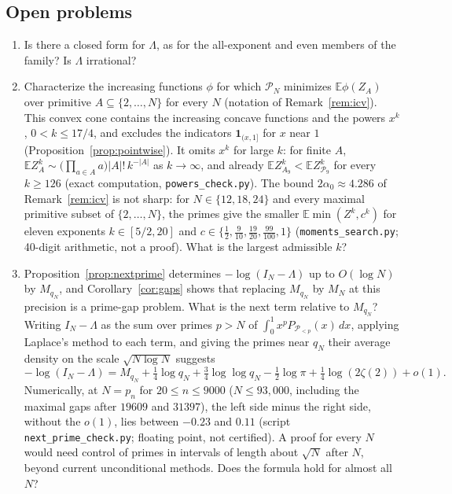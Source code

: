 \documentclass[11pt]{article}
\theoremstyle{remark}
\newcommand{\Prm}{\mathcal{P}}
\newcommand{\E}{\mathbb{E}}
\begin{document}
\subsection{Open problems}
\begin{enumerate}
\item Is there a closed form for $\Lambda$, as for the all-exponent and
even members of the family? Is $\Lambda$ irrational?
\item Characterize the increasing functions $\phi$ for which $\Prm_N$
minimizes $\E\phi(Z_A)$ over primitive $A\subseteq\{2,\dots,N\}$ for
every $N$ (notation of Remark~\ref{rem:icv}). This convex cone contains
the increasing concave functions and the powers $x^k$, $0<k\le17/4$,
and excludes the indicators $\mathbf 1_{(x,1]}$ for $x$ near $1$
(Proposition~\ref{prop:pointwise}). It omits $x^k$ for large $k$: for
finite $A$,
$\E Z_A^k\sim\bigl(\prod_{a\in A}a\bigr)|A|!\,k^{-|A|}$ as
$k\to\infty$, and already $\E Z_{A_9}^k<\E Z_{\Prm_9}^k$ for every
$k\ge126$ (exact computation, \texttt{powers\_check.py}). The bound
$2\alpha_0\approx4.286$ of Remark~\ref{rem:icv} is not sharp: for
$N\in\{12,18,24\}$ and every maximal primitive subset of
$\{2,\dots,N\}$, the primes give the smaller $\E\min(Z^k,c^k)$ for
eleven exponents $k\in[5/2,20]$ and
$c\in\{\tfrac12,\tfrac9{10},\tfrac{19}{20},\tfrac{99}{100},1\}$
(\texttt{moments\_search.py}; 40-digit arithmetic, not a proof). What
is the largest admissible $k$?
\item Proposition~\ref{prop:nextprime} determines $-\log(I_N-\Lambda)$
up to $O(\log N)$ by $M_{q_N}$, and Corollary~\ref{cor:gaps} shows that
replacing $M_{q_N}$ by $M_N$ at this precision is a prime-gap problem.
What is the next term relative to $M_{q_N}$? Writing $I_N-\Lambda$ as
the sum over primes $p>N$ of $\int_0^1x^pP_{\Prm_{<p}}(x)\,dx$, applying
Laplace's method to each term, and giving the primes near $q_N$ their
average density on the scale $\sqrt{N\log N}$ suggests
\[
  -\log(I_N-\Lambda)=M_{q_N}+\tfrac14\log q_N+\tfrac34\log\log q_N
  -\tfrac12\log\pi+\tfrac14\log(2\zeta(2))+o(1).
\]
Numerically, at $N=p_n$ for $20\le n\le9000$ ($N\le93{,}000$, including
the maximal gaps after $19609$ and $31397$), the left side minus the
right side, without the $o(1)$, lies between $-0.23$ and $0.11$ (script
\texttt{next\_prime\_check.py}; floating point, not certified). A proof
for every $N$ would need control of primes in intervals of length about
$\sqrt N$ after $N$, beyond current unconditional methods. Does the
formula hold for almost all $N$?
\end{enumerate}
\end{document}
